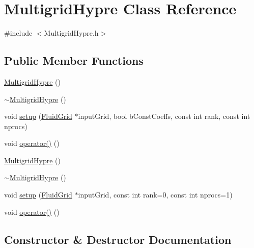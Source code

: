 \hypertarget{class_multigrid_hypre}{}\section{Multigrid\+Hypre Class Reference}
\label{class_multigrid_hypre}


{\ttfamily \#include $<$Multigrid\+Hypre.\+h$>$}

\subsection*{Public Member Functions}
\begin{DoxyCompactItemize}
\item 
\hyperlink{class_multigrid_hypre_ac1a9d5755db763264ca56598504808d8}{Multigrid\+Hypre} ()
\item 
\hyperlink{class_multigrid_hypre_a2c479c8b6408430d242bf44a5797d9fb}{$\sim$\+Multigrid\+Hypre} ()
\item 
void \hyperlink{class_multigrid_hypre_a43a4d038e324f28cb4076bfe73d219b3}{setup} (\hyperlink{_definitions_8h_aff3288a3741f5098bcc456bb13440189}{Fluid\+Grid} $\ast$input\+Grid, bool b\+Const\+Coeffs, const int rank, const int nprocs)
\item 
void \hyperlink{class_multigrid_hypre_a9a751a01b093bc8130fb0d84ceb3b82d}{operator()} ()
\item 
\hyperlink{class_multigrid_hypre_ac1a9d5755db763264ca56598504808d8}{Multigrid\+Hypre} ()
\item 
\hyperlink{class_multigrid_hypre_a2c479c8b6408430d242bf44a5797d9fb}{$\sim$\+Multigrid\+Hypre} ()
\item 
void \hyperlink{class_multigrid_hypre_abd431e4739066ebe7b808205e99a99b6}{setup} (\hyperlink{_definitions_8h_aff3288a3741f5098bcc456bb13440189}{Fluid\+Grid} $\ast$input\+Grid, const int rank=0, const int nprocs=1)
\item 
void \hyperlink{class_multigrid_hypre_a9a751a01b093bc8130fb0d84ceb3b82d}{operator()} ()
\end{DoxyCompactItemize}


\subsection{Constructor \& Destructor Documentation}
\hypertarget{class_multigrid_hypre_ac1a9d5755db763264ca56598504808d8}{}
